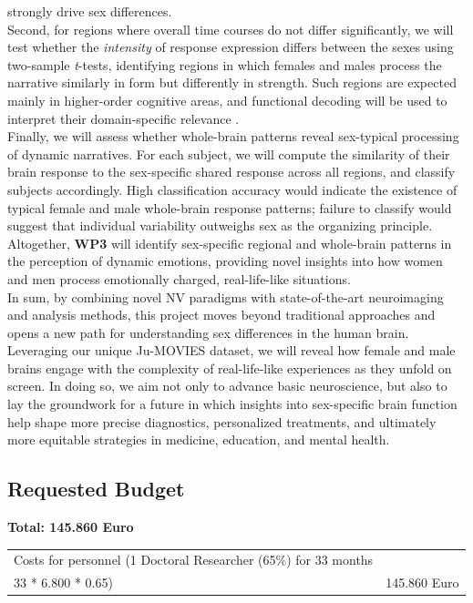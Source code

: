 \documentclass[11pt,a4paper]{article}
\begin{document}
strongly drive sex differences.\\
Second, for regions where overall time courses do not differ significantly, we will test whether the \textit{intensity} of 
response expression differs between the sexes using two-sample \textit{t}-tests, identifying regions in which 
females and males process the narrative similarly in form but differently in strength. 
Such regions are expected mainly in higher-order cognitive areas, and functional decoding will be
used to interpret their domain-specific relevance \parencite{foxMetaanalysisHumanNeuroimaging2014a}.\\  
Finally, we will assess whether whole-brain patterns reveal sex-typical processing of dynamic narratives. 
For each subject, we will compute the similarity of their brain response to the sex-specific shared response 
across all regions, and classify subjects accordingly. High classification accuracy would indicate 
the existence of typical female and male whole-brain response patterns; failure to classify would 
suggest that individual variability outweighs sex as the organizing principle.\\
Altogether, \textbf{WP3} will identify sex-specific regional and whole-brain patterns in the perception of 
dynamic emotions, providing novel insights into how women and men process emotionally charged, 
real-life-like situations.\\  
[6pt]
In sum, by combining novel NV paradigms with state-of-the-art neuroimaging and analysis methods, 
this project moves beyond traditional approaches and opens a new path for understanding sex differences 
in the human brain. Leveraging our unique Ju-MOVIES dataset, we will reveal how female and male brains engage 
with the complexity of real-life-like experiences as they unfold on screen.
In doing so, we aim not only to advance basic neuroscience, 
but also to lay the groundwork for a future in which insights into sex-specific brain 
function help shape more precise diagnostics, personalized treatments, and ultimately more equitable 
strategies in medicine, education, and mental health.

\newpage

\subsection*{Requested Budget}

\noindent\textbf{Total: 145.860 Euro}

\begin{longtable}{p{12cm} p{\dimexpr\textwidth-12cm-2\tabcolsep}}
\toprule
\endfirsthead
\endhead
Costs for personnel (1 Doctoral Researcher (65\%) for 33 months \\ 33 * 6.800 * 0.65) & 145.860 Euro \\
\bottomrule
\end{longtable}
\end{document}
